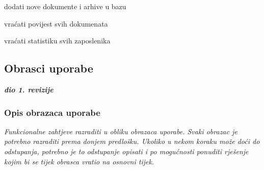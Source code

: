 \begin{packed_enum}
				\item  {}
				
				\begin{packed_enum}
					
					\item dodati nove dokumente i arhive u bazu
					\item vraćati povijest svih dokumenata
					\item vraćati statistiku svih zaposlenika
					
				\end{packed_enum}	
			
			\end{packed_enum}
			
			
			\eject 
			
			
				
			\subsection{Obrasci uporabe}
				
				\textbf{\textit{dio 1. revizije}}
				
				\subsubsection{Opis obrazaca uporabe}
					\textit{Funkcionalne zahtjeve razraditi u obliku obrazaca uporabe. Svaki obrazac je potrebno razraditi prema donjem predlošku. Ukoliko u nekom koraku može doći do odstupanja, potrebno je to odstupanje opisati i po mogućnosti ponuditi rješenje kojim bi se tijek obrasca vratio na osnovni tijek.}\\
					

					
				
